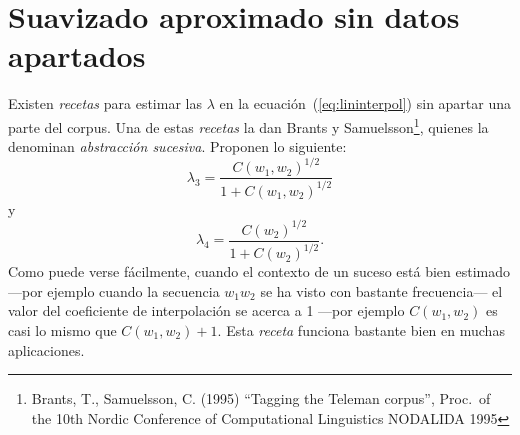 \documentclass[12pt,a4paper]{article} \usepackage[spanish]{babel}
\begin{document}
\section{Suavizado aproximado sin datos apartados}
Existen  \emph{recetas} para estimar las \(\lambda\) en la ecuación~(\ref{eq:lininterpol}) sin apartar una parte del corpus. Una de estas \emph{recetas} la dan Brants y Samuelsson\footnote{Brants, T., Samuelsson, C. (1995) ``Tagging the Teleman corpus'', Proc.\ of the 10th Nordic Conference of Computational Linguistics NODALIDA 1995}, quienes la denominan \emph{abstracción sucesiva}. Proponen 
lo siguiente:
\begin{equation}
  \label{eq:bsl3}
  \lambda_3=\frac{C(w_1,w_2)^{1/2}}{1+C(w_1,w_2)^{1/2}}
\end{equation}
y
\begin{equation}
  \label{eq:bsl4}
  \lambda_4=\frac{C(w_2)^{1/2}}{1+C(w_2)^{1/2}}.
\end{equation}
Como puede verse fácilmente, cuando el contexto de un suceso está bien estimado ---por ejemplo cuando la secuencia \(w_1w_2\) se ha visto con bastante frecuencia--- el valor del coeficiente de interpolación se acerca a 1 ---por ejemplo
\begin{math}
  C(w_1,w_2)
\end{math}
es casi lo mismo que \(C(w_1,w_2)+1\).
Esta \emph{receta} funciona bastante bien en muchas aplicaciones.
\end{document}
